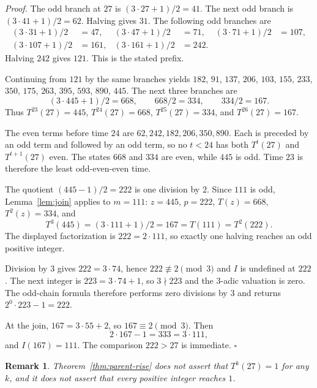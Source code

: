\documentclass[11pt,letterpaper]{article}
\newtheorem{remark}[theorem]{Remark}
\newenvironment{proof}{\noindent\textit{Proof.}}{\hfill\(\square\)}
\begin{document}
\begin{proof}
The odd branch at \(27\) is \((3\cdot 27+1)/2=41\). The next odd branch is \((3\cdot 41+1)/2=62\). Halving gives \(31\). The following odd branches are
\begin{align*}
(3\cdot 31+1)/2&=47,&
(3\cdot 47+1)/2&=71,&
(3\cdot 71+1)/2&=107,\\
(3\cdot 107+1)/2&=161,&
(3\cdot 161+1)/2&=242.
\end{align*}
Halving \(242\) gives \(121\). This is the stated prefix.

Continuing from \(121\) by the same branches yields \(182\), \(91\), \(137\), \(206\), \(103\), \(155\), \(233\), \(350\), \(175\), \(263\), \(395\), \(593\), \(890\), \(445\). The next three branches are
\[
(3\cdot 445+1)/2=668,\qquad 668/2=334,\qquad 334/2=167.
\]
Thus \(T^{23}(27)=445\), \(T^{24}(27)=668\), \(T^{25}(27)=334\), and \(T^{26}(27)=167\).

The even terms before time \(24\) are \(62,242,182,206,350,890\). Each is preceded by an odd term and followed by an odd term, so no \(t<24\) has both \(T^{t}(27)\) and \(T^{t+1}(27)\) even. The states \(668\) and \(334\) are even, while \(445\) is odd. Time \(23\) is therefore the least odd-even-even time.

The quotient \((445-1)/2=222\) is one division by \(2\). Since \(111\) is odd, Lemma~\ref{lem:join} applies to \(m=111\): \(z=445\), \(p=222\), \(T(z)=668\), \(T^{2}(z)=334\), and
\[
T^{3}(445)=(3\cdot 111+1)/2=167=T(111)=T^{2}(222).
\]
The displayed factorization is \(222=2\cdot 111\), so exactly one halving reaches an odd positive integer.

Division by \(3\) gives \(222=3\cdot 74\), hence \(222\not\equiv 2\pmod{3}\) and \(I\) is undefined at \(222\). The next integer is \(223=3\cdot 74+1\), so \(3\nmid 223\) and the \(3\)-adic valuation is zero. The odd-chain formula therefore performs zero divisions by \(3\) and returns \(2^{0}\cdot 223-1=222\).

At the join, \(167=3\cdot 55+2\), so \(167\equiv 2\pmod{3}\). Then
\[
2\cdot 167-1=333=3\cdot 111,
\]
and \(I(167)=111\). The comparison \(222>27\) is immediate.
\end{proof}

\begin{remark}
\label{rem:not-one}
Theorem~\ref{thm:parent-rise} does not assert that \(T^{k}(27)=1\) for any \(k\), and it does not assert that every positive integer reaches \(1\).
\end{remark}
\end{document}
